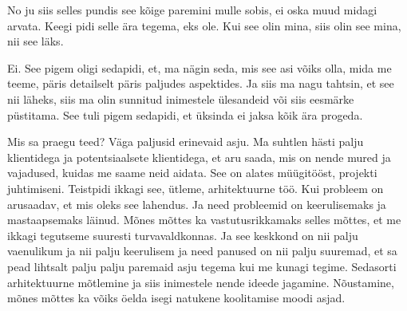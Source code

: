 
No ju siis selles pundis see  kõige paremini  mulle sobis, ei oska muud midagi 
arvata. Keegi pidi selle ära tegema, eks ole. Kui see olin mina, siis olin see 
mina, nii see läks.


Ei. See pigem oligi sedapidi, et, ma nägin seda, mis see asi võiks olla, mida 
me teeme,  päris detailselt päris paljudes aspektides. Ja siis ma nagu tahtsin, 
et see nii läheks, siis ma olin sunnitud  inimestele  ülesandeid või siis 
eesmärke püstitama. See tuli pigem sedapidi, et üksinda ei jaksa kõik ära 
progeda.


Mis sa praegu teed? Väga paljusid erinevaid asju. Ma suhtlen hästi palju 
klientidega ja potentsiaalsete klientidega, et aru saada, mis on  nende  mured 
ja vajadused, kuidas me saame   neid aidata. See on alates müügitööst, projekti 
juhtimiseni. Teistpidi ikkagi see, ütleme, arhitektuurne töö. Kui probleem on  
arusaadav, et mis oleks see lahendus. Ja need probleemid on keerulisemaks ja 
mastaapsemaks läinud. Mõnes mõttes ka vastutusrikkamaks selles mõttes, et me  
ikkagi tegutseme suuresti turvavaldkonnas. Ja see keskkond on nii palju 
vaenulikum ja nii palju keerulisem ja need panused on nii palju suuremad, et sa 
pead lihtsalt palju palju paremaid asju tegema kui me kunagi tegime. Sedasorti 
arhitektuurne  mõtlemine ja siis inimestele nende ideede jagamine. Nõustamine, 
mõnes mõttes ka võiks öelda isegi natukene koolitamise moodi asjad. 


